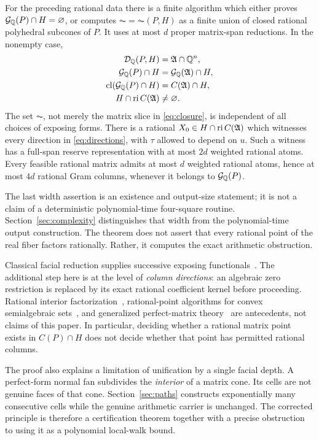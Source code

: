 \begin{theorem}\label{thm:main}
For the preceding rational data there is a finite algorithm which either proves $\mathcal G_{\mathbb Q}(P)\cap H=\varnothing$, or computes $\AC=\AC(P,H)$ as a finite union of closed rational polyhedral subcones of $P$. It uses at most $d$ proper matrix-span reductions. In the nonempty case,
\begin{align}
 \mathcal D_{\mathbb Q}(P,H)&=\mathfrak A\cap\mathbb Q^n,\label{eq:directions}\\
 \mathcal G_{\mathbb Q}(P)\cap H&=\mathcal G_{\mathbb Q}(\mathfrak A)\cap H,\label{eq:exactfiber}\\
 \operatorname{cl}(\mathcal G_{\mathbb Q}(P)\cap H)&=C(\mathfrak A)\cap H,\label{eq:closure}\\
 H\cap\operatorname{ri} C(\mathfrak A)&\ne\varnothing.\label{eq:slater}
\end{align}
The set $\AC$, not merely the matrix slice in \eqref{eq:closure}, is independent of all choices of exposing forms. There is a rational $X_0\in H\cap\operatorname{ri} C(\mathfrak A)$ which witnesses every direction in \eqref{eq:directions}, with $\tau$ allowed to depend on $u$. Such a witness has a full-span reserve representation with at most $2d$ weighted rational atoms. Every feasible rational matrix admits at most $d$ weighted rational atoms, hence at most $4d$ rational Gram columns, whenever it belongs to $\mathcal G_{\mathbb Q}(P)$.
\end{theorem}

The last width assertion is an existence and output-size statement; it is not a claim of a deterministic polynomial-time four-square routine. Section~\ref{sec:complexity} distinguishes that width from the polynomial-time output construction. The theorem does not assert that every rational point of the real fiber factors rationally. Rather, it computes the exact arithmetic obstruction.

Classical facial reduction supplies successive exposing functionals~\cite{BW,LMT}. The additional step here is at the level of \emph{column directions}: an algebraic zero restriction is replaced by its exact rational coefficient kernel before proceeding. Rational interior factorization~\cite{DSV17}, rational-point algorithms for convex semialgebraic sets~\cite{SEDZ}, and generalized perfect-matrix theory~\cite{OS26} are antecedents, not claims of this paper. In particular, deciding whether a rational matrix point exists in $C(P)\cap H$ does not decide whether that point has permitted rational columns.

The proof also explains a limitation of unification by a single facial depth. A perfect-form normal fan subdivides the \emph{interior} of a matrix cone. Its cells are not genuine faces of that cone. Section~\ref{sec:paths} constructs exponentially many consecutive cells while the genuine arithmetic carrier is unchanged. The corrected principle is therefore a certification theorem together with a precise obstruction to using it as a polynomial local-walk bound.

